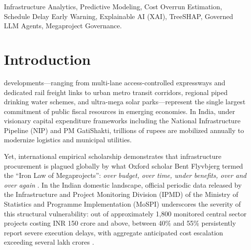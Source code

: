 \documentclass[conference]{IEEEtran}
\begin{document}
\begin{IEEEkeywords}
Infrastructure Analytics, Predictive Modeling, Cost Overrun Estimation, Schedule Delay Early Warning, Explainable AI (XAI), TreeSHAP, Governed LLM Agents, Megaproject Governance.
\end{IEEEkeywords}

\section{Introduction}
 developments---ranging from multi-lane access-controlled expressways and dedicated rail freight links to urban metro transit corridors, regional piped drinking water schemes, and ultra-mega solar parks---represent the single largest commitment of public fiscal resources in emerging economies. In India, under visionary capital expenditure frameworks including the National Infrastructure Pipeline (NIP) and PM GatiShakti, trillions of rupees are mobilized annually to modernize logistics and municipal utilities. 

Yet, international empirical scholarship demonstrates that infrastructure procurement is plagued globally by what Oxford scholar Bent Flyvbjerg termed the ``Iron Law of Megaprojects'': \textit{over budget, over time, under benefits, over and over again} \cite{b1}. In the Indian domestic landscape, official periodic data released by the Infrastructure and Project Monitoring Division (IPMD) of the Ministry of Statistics and Programme Implementation (MoSPI) underscores the severity of this structural vulnerability: out of approximately 1,800 monitored central sector projects costing INR 150 crore and above, between 40\% and 55\% persistently report severe execution delays, with aggregate anticipated cost escalation exceeding several lakh crores \cite{b2}.
\end{document}
